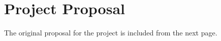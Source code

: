 \chapter{Project Proposal}
\label{app:proposal}

\indent \indent
The original proposal for the project is included from the next page.


